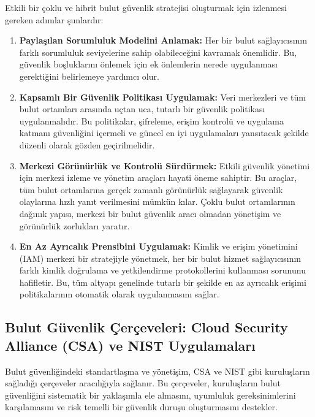 Etkili bir çoklu ve hibrit bulut güvenlik stratejisi oluşturmak için izlenmesi gereken adımlar şunlardır:
\begin{enumerate}
    \item \textbf{Paylaşılan Sorumluluk Modelini Anlamak:} Her bir bulut sağlayıcısının farklı sorumluluk seviyelerine sahip olabileceğini kavramak önemlidir. Bu, güvenlik boşluklarını önlemek için ek önlemlerin nerede uygulanması gerektiğini belirlemeye yardımcı olur.
    \item \textbf{Kapsamlı Bir Güvenlik Politikası Uygulamak:} Veri merkezleri ve tüm bulut ortamları arasında uçtan uca, tutarlı bir güvenlik politikası uygulanmalıdır. Bu politikalar, şifreleme, erişim kontrolü ve uygulama katmanı güvenliğini içermeli ve güncel en iyi uygulamaları yansıtacak şekilde düzenli olarak gözden geçirilmelidir.
    \item \textbf{Merkezi Görünürlük ve Kontrolü Sürdürmek:} Etkili güvenlik yönetimi için merkezi izleme ve yönetim araçları hayati öneme sahiptir. Bu araçlar, tüm bulut ortamlarına gerçek zamanlı görünürlük sağlayarak güvenlik olaylarına hızlı yanıt verilmesini mümkün kılar. Çoklu bulut ortamlarının dağınık yapısı, merkezi bir bulut güvenlik aracı olmadan yönetişim ve görünürlük zorlukları yaratır.
    \item \textbf{En Az Ayrıcalık Prensibini Uygulamak:} Kimlik ve erişim yönetimini (IAM) merkezi bir stratejiyle yönetmek, her bir bulut hizmet sağlayıcısının farklı kimlik doğrulama ve yetkilendirme protokollerini kullanması sorununu hafifletir. Bu, tüm altyapı genelinde tutarlı bir şekilde en az ayrıcalık erişimi politikalarının otomatik olarak uygulanmasını sağlar.
\end{enumerate}

\subsection{Bulut Güvenlik Çerçeveleri: Cloud Security Alliance (CSA) ve NIST Uygulamaları}

Bulut güvenliğindeki standartlaşma ve yönetişim, CSA ve NIST gibi kuruluşların sağladığı çerçeveler aracılığıyla sağlanır. Bu çerçeveler, kuruluşların bulut güvenliğini sistematik bir yaklaşımla ele almasını, uyumluluk gereksinimlerini karşılamasını ve risk temelli bir güvenlik duruşu oluşturmasını destekler.

